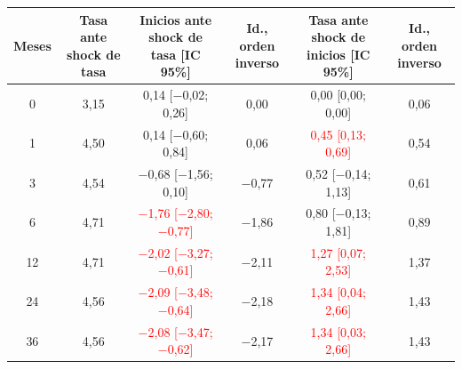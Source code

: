 \begin{tabular}{cccccc}
\toprule
Meses & Tasa ante shock de tasa & Inicios ante shock de tasa [IC 95\%] & Id., orden inverso & Tasa ante shock de inicios [IC 95\%] & Id., orden inverso
\\ \midrule
0 & 3{,}15 & 0{,}14 [\ensuremath{-}0{,}02; 0{,}26] & 0{,}00 & 0{,}00 [0{,}00; 0{,}00] & 0{,}06 \\
1 & 4{,}50 & 0{,}14 [\ensuremath{-}0{,}60; 0{,}84] & 0{,}06 & \textcolor{red}{0{,}45 [0{,}13; 0{,}69]} & 0{,}54 \\
3 & 4{,}54 & \ensuremath{-}0{,}68 [\ensuremath{-}1{,}56; 0{,}10] & \ensuremath{-}0{,}77 & 0{,}52 [\ensuremath{-}0{,}14; 1{,}13] & 0{,}61 \\
6 & 4{,}71 & \textcolor{red}{\ensuremath{-}1{,}76 [\ensuremath{-}2{,}80; \ensuremath{-}0{,}77]} & \ensuremath{-}1{,}86 & 0{,}80 [\ensuremath{-}0{,}13; 1{,}81] & 0{,}89 \\
12 & 4{,}71 & \textcolor{red}{\ensuremath{-}2{,}02 [\ensuremath{-}3{,}27; \ensuremath{-}0{,}61]} & \ensuremath{-}2{,}11 & \textcolor{red}{1{,}27 [0{,}07; 2{,}53]} & 1{,}37 \\
24 & 4{,}56 & \textcolor{red}{\ensuremath{-}2{,}09 [\ensuremath{-}3{,}48; \ensuremath{-}0{,}64]} & \ensuremath{-}2{,}18 & \textcolor{red}{1{,}34 [0{,}04; 2{,}66]} & 1{,}43 \\
36 & 4{,}56 & \textcolor{red}{\ensuremath{-}2{,}08 [\ensuremath{-}3{,}47; \ensuremath{-}0{,}62]} & \ensuremath{-}2{,}17 & \textcolor{red}{1{,}34 [0{,}03; 2{,}66]} & 1{,}43 \\
\bottomrule
\end{tabular}
